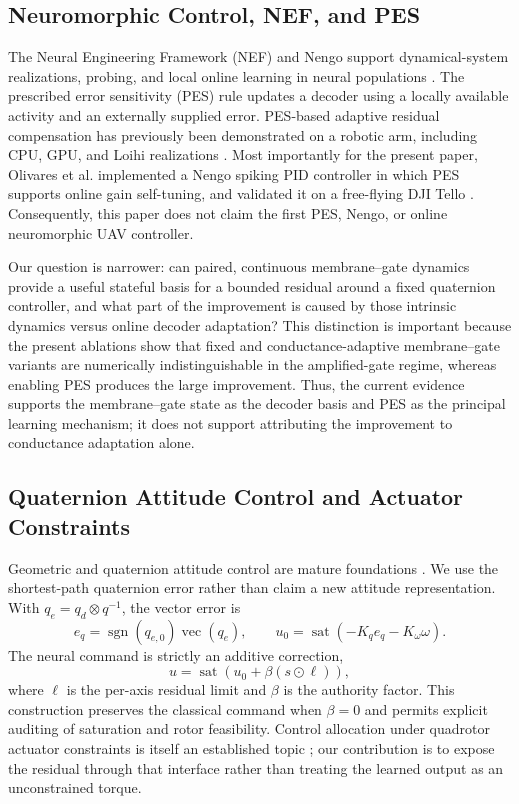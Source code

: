 \subsection{Neuromorphic Control, NEF, and PES}

The Neural Engineering Framework (NEF) and Nengo support dynamical-system
realizations, probing, and local online learning in neural populations
\cite{bekolay2014nengo}.  The prescribed error sensitivity (PES) rule updates a
decoder using a locally available activity and an externally supplied error.
PES-based adaptive residual compensation has previously been demonstrated on a
robotic arm, including CPU, GPU, and Loihi realizations
\cite{dewolf2016adaptive,dewolf2020nengo}.  Most importantly for the present
paper, Olivares et al. implemented a Nengo spiking PID controller in which PES
supports online gain self-tuning, and validated it on a free-flying DJI Tello
\cite{olivares2026selftuning}.  Consequently, this paper does not claim the first
PES, Nengo, or online neuromorphic UAV controller.

Our question is narrower: can paired, continuous membrane--gate dynamics provide
a useful stateful basis for a bounded residual around a fixed quaternion
controller, and what part of the improvement is caused by those intrinsic
dynamics versus online decoder adaptation?  This distinction is important
because the present ablations show that fixed and conductance-adaptive
membrane--gate variants are numerically indistinguishable in the amplified-gate
regime, whereas enabling PES produces the large improvement.  Thus, the current
evidence supports the membrane--gate state as the decoder basis and PES as the
principal learning mechanism; it does not support attributing the improvement to
conductance adaptation alone.

\subsection{Quaternion Attitude Control and Actuator Constraints}

Geometric and quaternion attitude control are mature foundations
\cite{lee2010geometric,fresk2013quaternion}.  We use the shortest-path quaternion
error rather than claim a new attitude representation.  With
$q_e=q_d\otimes q^{-1}$, the vector error is
\begin{equation}
 e_q=\operatorname{sgn}(q_{e,0})\operatorname{vec}(q_e),
 \qquad
 u_0=\operatorname{sat}(-K_qe_q-K_\omega\omega).
 \label{eq:baseline}
\end{equation}
The neural command is strictly an additive correction,
\begin{equation}
 u=\operatorname{sat}\!\left(u_0+\beta(s\odot\ell)\right),
 \label{eq:bounded_residual}
\end{equation}
where $\ell$ is the per-axis residual limit and $\beta$ is the authority factor.
This construction preserves the classical command when $\beta=0$ and permits
explicit auditing of saturation and rotor feasibility.  Control allocation under
quadrotor actuator constraints is itself an established topic
\cite{monteiro2016allocation}; our contribution is to expose the residual through
that interface rather than treating the learned output as an unconstrained torque.

